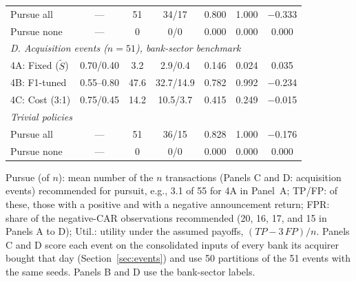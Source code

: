 \begin{table}[!t]
\begin{tabular}{lcccccc}
Pursue all & --- & 51 & 34/17 & 0.800 & 1.000 & $-$0.333 \\
Pursue none & --- & 0 & 0/0 & 0.000 & 0.000 & 0.000 \\
\midrule
\multicolumn{7}{l}{\textit{D. Acquisition events ($n=51$), bank-sector benchmark}} \\
4A: Fixed ($\tilde S$) & 0.70/0.40 & 3.2 & 2.9/0.4 & 0.146 & 0.024 & 0.035 \\
4B: F1-tuned & 0.55--0.80 & 47.6 & 32.7/14.9 & 0.782 & 0.992 & $-$0.234 \\
4C: Cost (3:1) & 0.75/0.45 & 14.2 & 10.5/3.7 & 0.415 & 0.249 & $-$0.015 \\
\multicolumn{7}{l}{\textit{Trivial policies}} \\
Pursue all & --- & 51 & 36/15 & 0.828 & 1.000 & $-$0.176 \\
Pursue none & --- & 0 & 0/0 & 0.000 & 0.000 & 0.000 \\
\bottomrule
\end{tabular}
\par\vspace{2pt}\parbox{0.94\columnwidth}{\scriptsize Pursue (of $n$): mean number of the $n$ transactions (Panels C and D: acquisition events) recommended for pursuit, e.g., 3.1 of 55 for 4A in Panel~A;
TP/FP: of these, those with a positive and with a negative announcement return; FPR: share of the negative-CAR observations
recommended (20, 16, 17, and 15 in Panels A to D); Util.: utility under the assumed payoffs, $(TP - 3\,FP)/n$. Panels C and D score each
event on the consolidated inputs of every bank its acquirer bought that day (Section~\ref{sec:events}) and use 50 partitions of the
51 events with the same seeds. Panels B and D use the bank-sector labels.}
\end{table}
